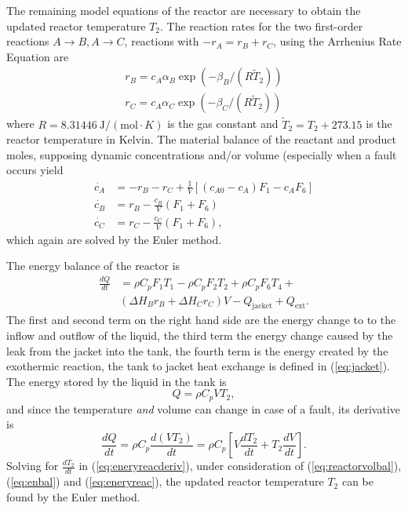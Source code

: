 \documentclass[10pt, conference, compsocconf]{IEEEtran}
\newcommand{\refeq}[1]{(\ref{eq:#1})}
\begin{document}
The remaining model equations of the reactor are necessary to
obtain the updated reactor temperature $T_{2}$.
The reaction rates for the two first-order reactions $A\rightarrow B, A\rightarrow C$,
reactions with $-r_{A} = r_{B}+r_{C}$, using the
Arrhenius Rate Equation are
\begin{align*}
r_{B} = c_{A}  \alpha_{B} \exp(-\beta_{B}/(R \tilde{T}_{2}))\nonumber \\
r_{C} = c_{A}  \alpha_{C} \exp(-\beta_{C}/(R \tilde{T}_{2}))
\end{align*}
where $R=8.31446\ \text{J}/(\text{mol}\cdot K)$ is the gas constant
and $\tilde{T}_{2}=T_{2}+273.15$ is the reactor temperature in Kelvin.
The material balance of the reactant and product moles,
supposing dynamic concentrations and/or volume (especially when a
fault occurs yield
\begin{align*}
\dot{c_{A}} &= -r_{B}-r_{C} + \frac{1}{V}
	\left[ (c_{A0}-c_{A}) F_{1} - c_{A} F_{6}\right] \nonumber \\
\dot{c_{B}} &= r_{B} - \frac{c_{B}}{V}(F_{1}+F_{6}) \nonumber \\
\dot{c_{C}} &= r_{C} - \frac{c_{C}}{V}(F_{1}+F_{6}),
\end{align*}
which again are solved by the Euler method.

The energy balance of the reactor is
\begin{align}
\frac{d Q}{dt} & = \rho C_{p}F_{1}T_{1} - \rho C_{p}F_{2}T_{2} +
\rho C_{p}F_{6}T_{4} +\nonumber \\
& (\Delta H_{B}r_{B}+\Delta H_{C}r_{C})V - Q_{\text{jacket}} + Q_{\text{ext}}.
\label{eq:enbal}
\end{align}
The first and second term on the right hand side are the
energy change to to the inflow and outflow of the liquid,
the third term the energy change caused by the leak from the
jacket into the tank, the fourth term is the energy created by
the exothermic reaction,
the tank to jacket heat exchange is
defined in \refeq{jacket}.
The energy stored by the liquid in the tank is
\begin{equation}
Q = \rho C_{p} VT_{2},
\label{eq:eneryreac}
\end{equation}
and since the temperature \emph{and} volume can change in case of
a fault, its derivative is
\begin{equation}
\frac{d Q}{dt} = \rho C_{p} \frac{d(VT_{2})}{dt} =
\rho C_{p}\left[V\frac{dT_{2}}{dt}+T_{2}\frac{dV}{dt} \right].
\label{eq:eneryreacderiv}
\end{equation}
Solving for $\frac{dT_{2}}{dt}$ in \refeq{eneryreacderiv},
under consideration of \refeq{reactorvolbal}, \refeq{enbal}
and \refeq{eneryreac}, the updated reactor temperature $T_{2}$
can be found by the Euler method.
\end{document}

